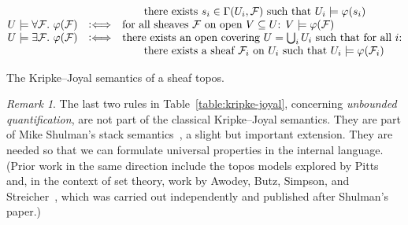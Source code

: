 \documentclass[10pt,reqno,a4paper]{amsbook}
\theoremstyle{definition}
\theoremstyle{plain}
\theoremstyle{remark}
\newtheorem{rem}[defn]{Remark}
\newcommand{\F}{\mathcal{F}}
\newcommand{\?}{\,{:}\,}
\renewcommand{\_}{\mathpunct{.}\,}
\newcommand{\Ll}{\vcentcolon\Longleftrightarrow}
\begin{document}
\begin{table}
\[\begin{array}{@{}lcl@{}}
    && \quad\quad \text{there exists~$s_i \in \Gamma(U_i, \F)$ such that
    $U_i \models \varphi(s_i)$} \\
    U \models \forall \F\_ \varphi(\F) &\Ll&
      \text{for all sheaves $\F$ on open $V \subseteq U$: $V \models \varphi(\F)$} \\
    U \models \exists \F\_ \varphi(\F) &\Ll&
      \text{there exists an open covering $U = \bigcup_i U_i$ such that for all~$i$:} \\
    && \quad\quad \text{there exists a sheaf~$\F_i$ on~$U_i$ such that
    $U_i \models \varphi(\F_i)$}
  \end{array} \]
  \caption{\label{table:kripke-joyal}The Kripke--Joyal semantics of a sheaf
  topos.}
\end{table}

\begin{rem}The last two rules in Table~\ref{table:kripke-joyal}, concerning
\emph{unbounded quantification}, are not part of the classical Kripke--Joyal
semantics. They are part of Mike Shulman's stack semantics~\cite{shulman:stack},
a slight but important extension. They are needed so that we can formulate universal
properties in the internal language. (Prior work in the same direction include
the topos models explored by Pitts~\cite[Section~3]{pitts:polymorphism} and, in
the context of set theory, work by Awodey, Butz, Simpson, and
Streicher~\cite{awodey-butz-simpson-streicher:bist}, which was carried out
independently and published after Shulman's paper.)
\end{rem}
\end{document}
